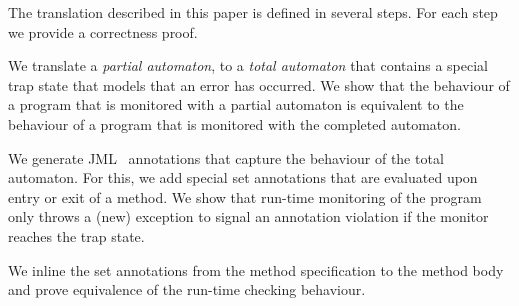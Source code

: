 
The translation described in this paper is defined in several
steps. For each step we provide a correctness proof.
\begin{inparaenum}
\item We translate a \emph{partial automaton}, to a \emph{total automaton}
that contains a special trap state that models that an error has occurred.
%
We show that the behaviour of a program that is monitored with a partial
automaton is equivalent to the behaviour of a program that is monitored with
the completed automaton.
\item We generate JML~\cite{LeavensPCCRCK05} annotations that capture the
behaviour of the total automaton.
For this, we add special \textsf{set} annotations that are evaluated
upon entry or exit of a method.
We show that run-time monitoring of the program
only throws a (new) exception to signal an annotation violation if the
monitor reaches the trap state.
\item We inline the \textsf{set} annotations from the method specification
to the method body and prove equivalence of the run-time checking behaviour.
\end{inparaenum}
